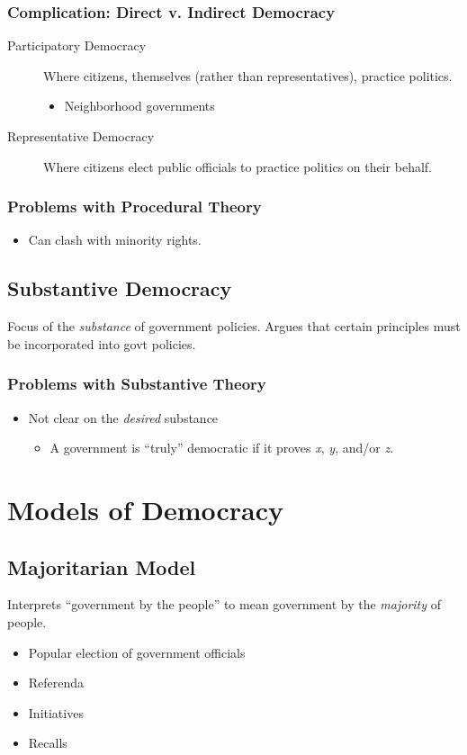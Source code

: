 \subsubsection{Complication: Direct v. Indirect Democracy}
\begin{description}
    \item[Participatory Democracy] Where citizens, themselves (rather than representatives), practice politics.
    \begin{itemize}
        \item Neighborhood governments
    \end{itemize}
    \item[Representative Democracy] Where citizens elect public officials to practice politics on their behalf.
\end{description}
\subsubsection{Problems with Procedural Theory}
\begin{itemize}
    \item Can clash with minority rights.
\end{itemize}

\subsection{Substantive Democracy}
Focus of the \textit{substance} of government policies. Argues that certain principles must be incorporated into govt policies.
\subsubsection{Problems with Substantive Theory}
\begin{itemize}
    \item Not clear on the \textit{desired} substance
    \begin{itemize}
        \item A government is ``truly'' democratic if it proves \textit{x}, \textit{y}, and/or \textit{z}.
    \end{itemize}
\end{itemize}

\section{Models of Democracy}
\subsection{Majoritarian Model}
Interprets ``government by the people'' to mean government by the \textit{majority} of people.
\begin{itemize}
    \item Popular election of government officials
    \item Referenda
    \item Initiatives
    \item Recalls
\end{itemize}

